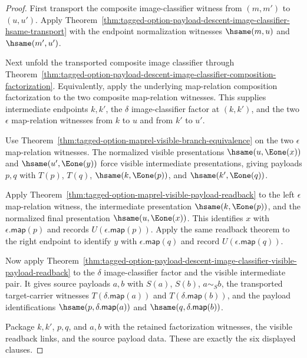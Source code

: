 \begin{proof}
First transport the composite image-classifier witness from $(m,m')$ to
$(u,u')$. Apply
Theorem~\ref{thm:tagged-option-payload-descent-image-classifier-hsame-transport}
with the endpoint normalization witnesses $\hsame(m,u)$ and $\hsame(m',u')$.

Next unfold the transported composite image classifier through
Theorem~\ref{thm:tagged-option-payload-descent-image-classifier-composition-factorization}.
Equivalently, apply the underlying map-relation composition factorization to the
two composite map-relation witnesses. This supplies intermediate endpoints
$k,k'$, the $\delta$ image-classifier factor at $(k,k')$, and the two
$\epsilon$ map-relation witnesses from $k$ to $u$ and from $k'$ to $u'$.

Use Theorem~\ref{thm:tagged-option-maprel-visible-branch-equivalence} on the two
$\epsilon$ map-relation witnesses. The normalized visible presentations
$\hsame(u,\Eone(x))$ and $\hsame(u',\Eone(y))$ force visible intermediate
presentations, giving payloads $p,q$ with $T(p)$, $T(q)$,
$\hsame(k,\Eone(p))$, and $\hsame(k',\Eone(q))$.

Apply Theorem~\ref{thm:tagged-option-maprel-visible-payload-readback} to the
left $\epsilon$ map-relation witness, the intermediate presentation
$\hsame(k,\Eone(p))$, and the normalized final presentation
$\hsame(u,\Eone(x))$. This identifies $x$ with $\epsilon.\mathsf{map}(p)$ and
records $U(\epsilon.\mathsf{map}(p))$. Apply the same readback theorem to the
right endpoint to identify $y$ with $\epsilon.\mathsf{map}(q)$ and record
$U(\epsilon.\mathsf{map}(q))$.

Now apply
Theorem~\ref{thm:tagged-option-payload-descent-image-classifier-visible-payload-readback}
to the $\delta$ image-classifier factor and the visible intermediate pair. It
gives source payloads $a,b$ with $S(a)$, $S(b)$, $a\sim_S b$, the transported
target-carrier witnesses $T(\delta.\mathsf{map}(a))$ and
$T(\delta.\mathsf{map}(b))$, and the payload identifications
$\hsame(p,\delta.\mathsf{map}(a))$ and $\hsame(q,\delta.\mathsf{map}(b))$.

Package $k,k'$, $p,q$, and $a,b$ with the retained factorization witnesses, the
visible readback links, and the source payload data. These are exactly the six
displayed clauses.
\end{proof}

